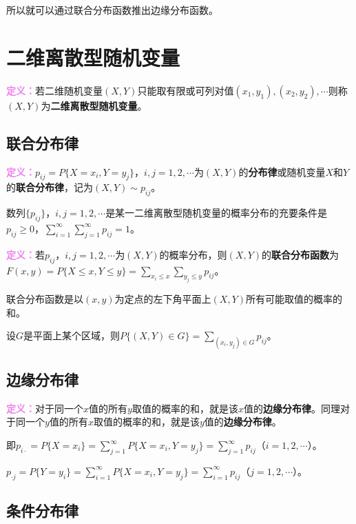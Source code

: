 \documentclass[UTF8, 12pt]{ctexart}
\begin{document}
所以就可以通过联合分布函数推出边缘分布函数。

\section{二维离散型随机变量}

\textcolor{violet}{\textbf{定义：}}若二维随机变量$(X,Y)$只能取有限或可列对值$(x_1,y_1),(x_2,y_2),\cdots$则称$(X,Y)$为\textbf{二维离散型随机变量}。

\subsection{联合分布律}

\textcolor{violet}{\textbf{定义：}}$p_{ij}=P\{X=x_i,Y=y_j\}$，$i,j=1,2,\cdots$为$(X,Y)$的\textbf{分布律}或随机变量$X$和$Y$的\textbf{联合分布律}，记为$(X,Y)\sim p_{ij}$。

数列$\{p_{ij}\}$，$i,j=1,2,\cdots$是某一二维离散型随机变量的概率分布的充要条件是$p_{ij}\geqslant0$，$\sum\limits_{i=1}^\infty\sum\limits_{j=1}^\infty p_{ij}=1$。

\textcolor{violet}{\textbf{定义：}}若$p_{ij}$，$i,j=1,2,\cdots$为$(X,Y)$的概率分布，则$(X,Y)$的\textbf{联合分布函数}为$F(x,y)=P\{X\leqslant x,Y\leqslant y\}=\sum\limits_{x_i\leqslant x}\sum\limits_{y_j\leqslant y}p_{ij}$。

联合分布函数是以$(x,y)$为定点的左下角平面上$(X,Y)$所有可能取值的概率的和。

设$G$是平面上某个区域，则$P\{(X,Y)\in G\}=\sum\limits_{(x_i,y_j)\in G}p_{ij}$。

\subsection{边缘分布律}

\textcolor{violet}{\textbf{定义：}}对于同一个$x$值的所有$y$取值的概率的和，就是该$x$值的\textbf{边缘分布律}。同理对于同一个$y$值的所有$x$取值的概率的和，就是该$y$值的\textbf{边缘分布律}。

即$p_{i\cdot}=P\{X=x_i\}=\sum\limits_{j=1}^\infty P\{X=x_i,Y=y_j\}=\sum\limits_{j=1}^\infty p_{ij}$（$i=1,2,\cdots$）。

$p_{\cdot j}=P\{Y=y_i\}=\sum\limits_{i=1}^\infty P\{X=x_i,Y=y_j\}=\sum\limits_{i=1}^\infty p_{ij}$（$j=1,2,\cdots$）。

\subsection{条件分布律}
\end{document}
